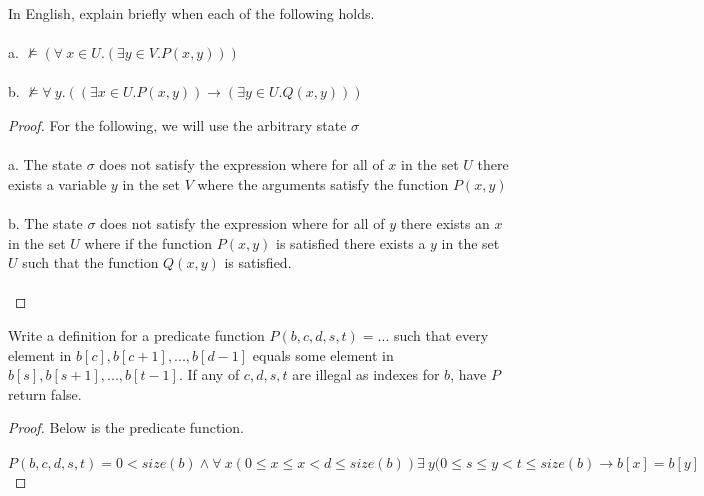\documentclass[12pt]{article}
\newenvironment{exercise}[2][Exercise]{\begin{trivlist}
\item[\hskip \labelsep {\bfseries #1}\hskip \labelsep {\bfseries #2.}]}{\end{trivlist}}
\begin{document}
\begin{exercise}{8}
In English, explain briefly when each of the following holds. \\ \\
a. $\not\models ( \forall\: x \in U. (\exists y \in V. P(x,y)))$ \\ \\ 
b. $\not\models \forall\: y. ((\exists x \in U. P(x,y)) \rightarrow (\exists y \in U. Q(x,y)))$
\end{exercise}

\begin{proof}
For the following, we will use the arbitrary state $\sigma$ \\ \\
a. The state $\sigma$ does not satisfy the expression where for all of $x$ in the set $U$ there exists a variable $y$ in the set $V$ where the arguments satisfy the function $P(x,y)$ \\ \\ 
b. The state $\sigma$ does not satisfy the expression where for all of $y$ there exists an $x$ in the set $U$ where if the function $P(x,y)$ is satisfied there exists a $y$ in the set $U$ such that the function $Q(x,y)$ is satisfied. \\ \\ 
\end{proof}

\begin{exercise}{9}
Write a definition for a predicate function $P(b, c, d, s, t) = ...$ such that every element in $b[c], b[c+1],...,b[d-1]$ equals some element in $b[s], b[s+1],...,b[t-1]$. If any of $c,d,s,t$ are illegal as indexes for $b$, have $P$ return false.
\end{exercise}

\begin{proof}
Below is the predicate function. \\ \\
$P(b,c,d,s,t) = 0 < size(b) \land \forall\: x(0 \leq x \leq x < d \leq size(b)) \exists\: y(0 \leq s \leq y < t \leq size(b) \rightarrow b[x] = b[y]$

\end{proof}
\end{document}
